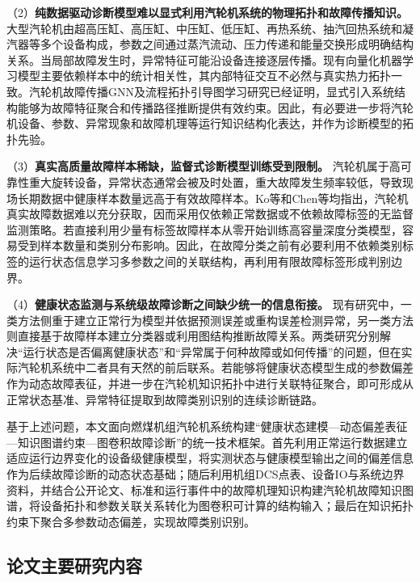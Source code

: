 （2）\textbf{纯数据驱动诊断模型难以显式利用汽轮机系统的物理拓扑和故障传播知识。} 大型汽轮机由超高压缸、高压缸、中压缸、低压缸、再热系统、抽汽回热系统和凝汽器等多个设备构成，参数之间通过蒸汽流动、压力传递和能量交换形成明确结构关系。当局部故障发生时，异常特征可能沿设备连接逐层传播。现有向量化机器学习模型主要依赖样本中的统计相关性，其内部特征交互不必然与真实热力拓扑一致。汽轮机故障传播GNN及流程拓扑引导图学习研究已经证明，显式引入系统结构能够为故障特征聚合和传播路径推断提供有效约束\cite{ZhangHu2021FaultPropagationGNN,Jia2023TopologyGuidedGraph}。因此，有必要进一步将汽轮机设备、参数、异常现象和故障机理等运行知识结构化表达，并作为诊断模型的拓扑先验。

（3）\textbf{真实高质量故障样本稀缺，监督式诊断模型训练受到限制。} 汽轮机属于高可靠性重大旋转设备，异常状态通常会被及时处置，重大故障发生频率较低，导致现场长期数据中健康样本数量远高于有效故障样本。Ko等和Chen等均指出，汽轮机真实故障数据难以充分获取，因而采用仅依赖正常数据或不依赖故障标签的无监督监测策略\cite{Ko2022DynamicThresholdAE,Chen2023AdaptiveTransfer}。若直接利用少量有标签故障样本从零开始训练高容量深度分类模型，容易受到样本数量和类别分布影响。因此，在故障分类之前有必要利用不依赖类别标签的运行状态信息学习多参数之间的关联结构，再利用有限故障标签形成判别边界。

（4）\textbf{健康状态监测与系统级故障诊断之间缺少统一的信息衔接。} 现有研究中，一类方法侧重于建立正常行为模型并依据预测误差或重构误差检测异常\cite{Dettori2017MonitoringModels,Ko2022DynamicThresholdAE,Zhai2024CAEWarning}，另一类方法则直接基于故障样本建立分类器或利用图结构推断故障关系\cite{Salahshoor2010SVMANFIS,ZhangHu2021FaultPropagationGNN}。两类研究分别解决“运行状态是否偏离健康状态”和“异常属于何种故障或如何传播”的问题，但在实际汽轮机系统中二者具有天然的前后联系。若能够将健康状态模型生成的参数偏差作为动态故障表征，并进一步在汽轮机知识拓扑中进行关联特征聚合，即可形成从正常状态基准、异常特征提取到故障类别识别的连续诊断链路。

基于上述问题，本文面向燃煤机组汽轮机系统构建“健康状态建模—动态偏差表征—知识图谱约束—图卷积故障诊断”的统一技术框架。首先利用正常运行数据建立适应运行边界变化的设备级健康模型，将实测状态与健康模型输出之间的偏差信息作为后续故障诊断的动态状态基础；随后利用机组DCS点表、设备IO与系统边界资料，并结合公开论文、标准和运行事件中的故障机理知识构建汽轮机故障知识图谱，将设备拓扑和参数关联关系转化为图卷积可计算的结构输入；最后在知识拓扑约束下聚合多参数动态偏差，实现故障类别识别。

\subsection{论文主要研究内容}

